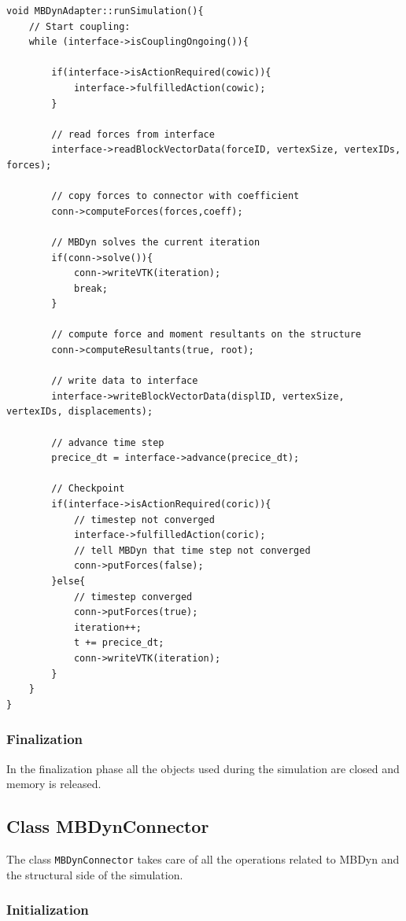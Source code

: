 \lstset{language=C++}
\begin{lstlisting}[caption=MBDynAdapter simulation execution,label=lst:adapter-exec]
void MBDynAdapter::runSimulation(){
	// Start coupling:
	while (interface->isCouplingOngoing()){

		if(interface->isActionRequired(cowic)){
			interface->fulfilledAction(cowic);
		}

		// read forces from interface
		interface->readBlockVectorData(forceID, vertexSize, vertexIDs, forces);

		// copy forces to connector with coefficient
		conn->computeForces(forces,coeff);

        // MBDyn solves the current iteration
		if(conn->solve()){
			conn->writeVTK(iteration);
			break;
		}
        
        // compute force and moment resultants on the structure
		conn->computeResultants(true, root);

		// write data to interface
		interface->writeBlockVectorData(displID, vertexSize, vertexIDs, displacements);

		// advance time step
		precice_dt = interface->advance(precice_dt);

		// Checkpoint
		if(interface->isActionRequired(coric)){
			// timestep not converged
			interface->fulfilledAction(coric);
			// tell MBDyn that time step not converged
			conn->putForces(false);
		}else{
			// timestep converged
			conn->putForces(true);
			iteration++;
			t += precice_dt;
			conn->writeVTK(iteration);
		}
	}
}

\end{lstlisting}


\subsubsection{Finalization}

In the finalization phase all the objects used during the simulation are closed and memory is released.

\subsection{Class MBDynConnector}
\label{sec:mbdyn-connector.h}

The class \texttt{MBDynConnector} takes care of all the operations related to MBDyn and the structural side of the simulation. 

\subsubsection{Initialization}


